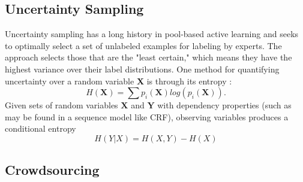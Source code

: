 \subsection{Uncertainty Sampling}
\label{sec:uncertainty}
Uncertainty sampling has a long history in pool-based active learning \cite{Lewis94heterogeneousuncertainty} and seeks to optimally select a set of unlabeled examples for labeling by experts.  The approach selects those that are the "least certain," which means they have the highest variance over their label distributions.  One method for quantifying uncertainty over a random variable \textbf{X} is through its entropy \cite{cover91}:
\begin{equation}
H(\mathbf{X}) = \sum p_{i}(\mathbf{X})log(p_{i}(\mathbf{X})).
\end{equation}
Given sets of random variables $\mathbf{X}$ and $\mathbf{Y}$ with dependency properties (such as may be found in a sequence model like CRF), observing variables produces a conditional entropy
\begin{equation}
H(Y|X) = H(X,Y) - H(X)
\end{equation}

\subsection{Crowdsourcing}
